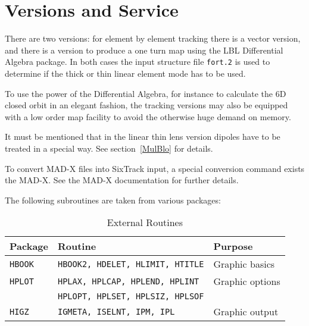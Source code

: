\section{Versions and Service}

There are two versions: for element by element tracking there is a vector version, and there is a version to produce a one turn map using the LBL Differential Algebra package.
In both cases the input structure file \texttt{fort.2} is used to determine if the thick or thin linear element mode has to be used.

To use the power of the Differential Algebra, for instance to calculate the 6D closed orbit in an elegant fashion, the tracking versions may also be equipped with a low order map facility to avoid the otherwise huge demand on memory.

It must be mentioned that in the linear thin lens version dipoles have to be treated in a special way.
See section~\ref{MulBlo} for details.

To convert MAD-X files into SixTrack input, a special conversion command exists the MAD-X.
See the MAD-X documentation for further details.

The following subroutines are taken from various packages:

\begin{table}[h]
    \caption{External Routines}
    \label{T-ExtRou}
    \centering
    \renewcommand{\arraystretch}{1.5}
    \begin{tabular}{|l|l|l|}
        \hline
        \rowcolor{blue!30}
        \textbf{Package} & \textbf{Routine} & \textbf{Purpose} \\
        \hline
        \texttt{HBOOK}  & \texttt{HBOOK2, HDELET, HLIMIT, HTITLE} & Graphic basics \\
        \hline
        \texttt{HPLOT}  & \texttt{HPLAX,  HPLCAP, HPLEND, HPLINT} & Graphic options \\
        \cline{2-2}
                        & \texttt{HPLOPT, HPLSET, HPLSIZ, HPLSOF} &  \\
        \hline
        \texttt{HIGZ}   & \texttt{IGMETA, ISELNT, IPM, IPL}       & Graphic output \\
        \hline
    \end{tabular}
\end{table}

